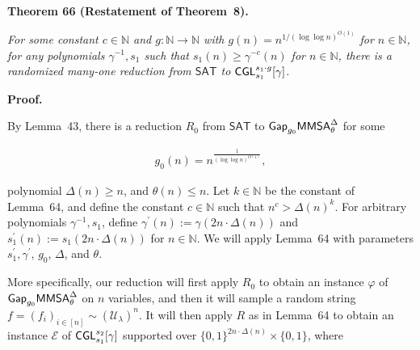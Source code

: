 \documentclass[10pt,a4paper]{article}
\begin{document}


\par\medskip\noindent\textbf{
\textbf{Theorem 66}\textbf{ }(Restatement of Theorem 8)\textbf{.}
}\par



\emph{For some constant $c\in\mathbb{N}$ and $g:\mathbb{N}\to\mathbb{N}$ with $g(n)=n^{1/(\log\log n)^{O(1)}}$ for $n\in\mathbb{N}$, for any polynomials $\gamma^{-1},s_{1}$ such that $s_{1}(n)\geq\gamma^{-c}(n)$ for $n\in\mathbb{N}$, there is a randomized many-one reduction from ${\mathsf{SAT}}$ to ${\sf CGL}_{s_{1}}^{s_{1}\cdot g}[\gamma]$.}\par








\par\medskip\noindent\textbf{Proof.}\par




By Lemma 43, there is a reduction $R_{0}$ from ${\mathsf{SAT}}$ to ${\sf Gap}_{g_{0}}{\mathsf{MMSA}}_{\theta}^{\Delta}$ for some\par


\[\begin{gathered}
g_{0}(n)=n^{\frac{1}{(\log\log n)^{O(1)}}},
\end{gathered}\]


polynomial $\Delta(n)\geq n$, and $\theta(n)\leq n$. Let $k\in\mathbb{N}$ be the constant of Lemma 64, and define the constant $c\in\mathbb{N}$ such that $n^{c}>\Delta(n)^{k}$. For arbitrary polynomials $\gamma^{-1},s_{1}$, define $\gamma^{\prime}(n):=\gamma(2n\cdot\Delta(n))$ and $s_{1}^{\prime}(n):=s_{1}(2n\cdot\Delta(n))$ for $n\in\mathbb{N}$. We will apply Lemma 64 with parameters $s_{1}^{\prime},\gamma^{\prime}$, $g_{0}$, $\Delta$, and $\theta$.\par




More specifically, our reduction will first apply $R_{0}$ to obtain an instance $\varphi$ of ${\sf Gap}_{g_{0}}{\mathsf{MMSA}}_{\theta}^{\Delta}$ on $n$ variables, and then it will sample a random string $f=(f_{i})_{i\in[n]}\sim(\mathcal{U}_{\lambda})^{n}$. It will then apply $R$ as in Lemma 64 to obtain an instance $\mathcal{E}$ of ${\sf CGL}_{s_{1}}^{s_{2}}[\gamma]$ supported over $\{0,1\}^{2n\cdot\Delta(n)}\times\{0,1\}$, where\par
\end{document}
